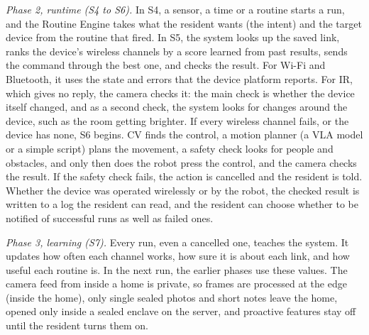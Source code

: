 \documentclass[conference]{IEEEtran}
\begin{document}
\textit{Phase 2, runtime (S4 to S6).} In S4, a sensor, a time or a routine starts a run, and the Routine Engine takes what the resident wants (the intent) and the target device from the routine that fired. In S5, the system looks up the saved link, ranks the device's wireless channels by a score learned from past results, sends the command through the best one, and checks the result. For Wi-Fi and Bluetooth, it uses the state and errors that the device platform reports. For IR, which gives no reply, the camera checks it: the main check is whether the device itself changed, and as a second check, the system looks for changes around the device, such as the room getting brighter. If every wireless channel fails, or the device has none, S6 begins. CV finds the control, a motion planner (a VLA model or a simple script) plans the movement, a safety check looks for people and obstacles, and only then does the robot press the control, and the camera checks the result. If the safety check fails, the action is cancelled and the resident is told. Whether the device was operated wirelessly or by the robot, the checked result is written to a log the resident can read, and the resident can choose whether to be notified of successful runs as well as failed ones.

\textit{Phase 3, learning (S7).} Every run, even a cancelled one, teaches the system. It updates how often each channel works, how sure it is about each link, and how useful each routine is. In the next run, the earlier phases use these values. The camera feed from inside a home is private, so frames are processed at the edge (inside the home), only single sealed photos and short notes leave the home, opened only inside a sealed enclave on the server, and proactive features stay off until the resident turns them on.
\end{document}
